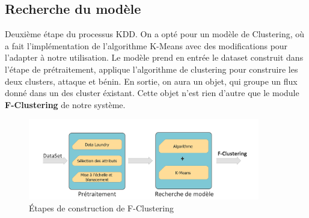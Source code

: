 \subsection{Recherche du modèle}
Deuxième étape du processus KDD. On a opté pour un modèle de Clustering, où a fait l'implémentation de l'algorithme K-Means avec des modifications pour l'adapter à notre utilisation. Le modèle prend en entrée le dataset construit dans l'étape de prétraitement, applique l'algorithme de clustering pour construire les deux clusters, attaque et bénin. En sortie, on aura un objet, qui groupe un flux donné dans un des cluster éxistant. Cette objet n'est rien d'autre que le module \textbf{F-Clustering} de notre système.
\begin{figure}[h]
\centering
\includegraphics[width=0.9\textwidth]{Figures/Diagramme2}
\decoRule
\caption{Étapes de construction de F-Clustering}
\label{fig:F-Clustering_Diagramme}
\end{figure} 


